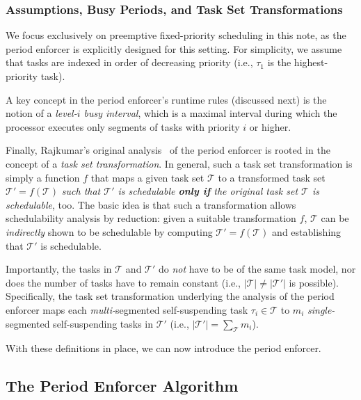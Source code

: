 \subsubsection{Assumptions, Busy Periods, and Task Set Transformations}
\label{sec:misc-defs}

We focus exclusively on preemptive fixed-priority scheduling in this note, as the period enforcer is explicitly designed for this setting. For simplicity, we assume that tasks are indexed in order of decreasing priority (i.e., $\tau_1$ is the highest-priority task). 

A key concept in the period enforcer's runtime rules (discussed next) is the notion of a \emph{level-$i$ busy interval}, which is a maximal interval during which  the processor executes only segments of tasks with priority $i$ or higher.

\newcommand{\tset}[0]{\mathcal{T}}

Finally, Rajkumar's original analysis~\cite{Raj:suspension1991} of the period enforcer is rooted in the concept of a \emph{task set transformation}. In general, such a task set transformation is simply a function $f$ that maps a given task set $\tset$ to a transformed task set $\tset' = f(\tset)$ \emph{such that $\tset'$ is schedulable \textbf{only if} the original task set $\tset$ is schedulable}, too. The basic idea is that such a transformation allows schedulability analysis by reduction: given a suitable transformation $f$, $\tset$ can be  \emph{indirectly} shown to be schedulable by computing $\tset' = f(\tset)$ and establishing that $\tset'$ is schedulable.



Importantly, the tasks in $\tset$ and $\tset'$ do \emph{not} have to be of the same task model, nor does the number of tasks have to remain constant (i.e.,  $|\tset| \neq |\tset'|$ is possible). Specifically, the task set transformation underlying the analysis of the period enforcer maps each \emph{multi-}segmented self-suspending task $\tau_i \in \tset$  to $m_i$ \emph{single-}segmented self-suspending tasks in $\tset'$ (i.e., $|\tset'| = \sum_{\tset} m_i$).

With these definitions in place, we can now introduce the period enforcer. 



\subsection{The Period Enforcer Algorithm}
\label{sec:pe}

